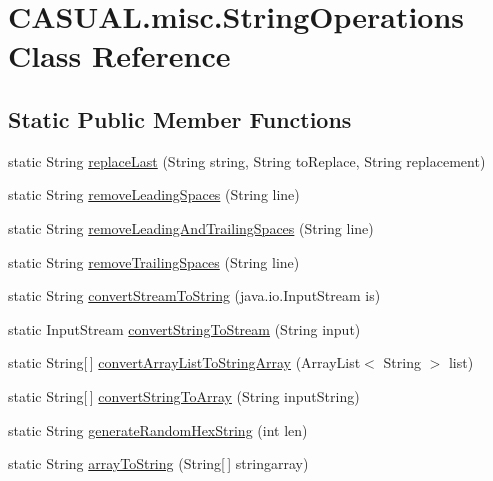 \hypertarget{classCASUAL_1_1misc_1_1StringOperations}{\section{C\-A\-S\-U\-A\-L.\-misc.\-String\-Operations Class Reference}
\label{classCASUAL_1_1misc_1_1StringOperations}
}
\subsection*{Static Public Member Functions}
\begin{DoxyCompactItemize}
\item 
static String \hyperlink{classCASUAL_1_1misc_1_1StringOperations_a2ca54978e1c7207cfc2a5a5526c26e48}{replace\-Last} (String string, String to\-Replace, String replacement)
\item 
static String \hyperlink{classCASUAL_1_1misc_1_1StringOperations_a917dd1b4316d383992c5eba6c0960934}{remove\-Leading\-Spaces} (String line)
\item 
static String \hyperlink{classCASUAL_1_1misc_1_1StringOperations_a9e737d317a79c13c3c9ae279fd6c26a8}{remove\-Leading\-And\-Trailing\-Spaces} (String line)
\item 
static String \hyperlink{classCASUAL_1_1misc_1_1StringOperations_a6e73c975bfeec0c3737203043c72190b}{remove\-Trailing\-Spaces} (String line)
\item 
static String \hyperlink{classCASUAL_1_1misc_1_1StringOperations_ac656345120c52916e47e2d24f62a8d73}{convert\-Stream\-To\-String} (java.\-io.\-Input\-Stream is)
\item 
static Input\-Stream \hyperlink{classCASUAL_1_1misc_1_1StringOperations_a813e85c2bd5595496dc70c336d045e53}{convert\-String\-To\-Stream} (String input)
\item 
static String\mbox{[}$\,$\mbox{]} \hyperlink{classCASUAL_1_1misc_1_1StringOperations_ad37eeeaf74afa6c537486c4103ac07ab}{convert\-Array\-List\-To\-String\-Array} (Array\-List$<$ String $>$ list)
\item 
static String\mbox{[}$\,$\mbox{]} \hyperlink{classCASUAL_1_1misc_1_1StringOperations_a20b27a70d8a3a625c27001f6a072bf8d}{convert\-String\-To\-Array} (String input\-String)
\item 
static String \hyperlink{classCASUAL_1_1misc_1_1StringOperations_ad287e81ccf48546cd49738824cbb1a25}{generate\-Random\-Hex\-String} (int len)
\item 
static String \hyperlink{classCASUAL_1_1misc_1_1StringOperations_a6707927f6d6cc06c8f9bf70e151218d0}{array\-To\-String} (String\mbox{[}$\,$\mbox{]} stringarray)
\end{DoxyCompactItemize}


